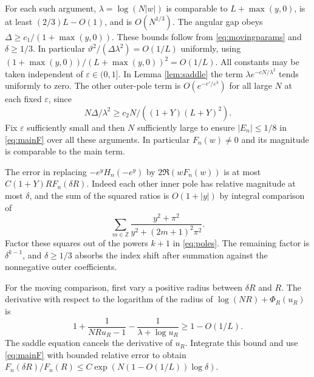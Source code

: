\documentclass[11pt]{article}
\begin{document}
For each such argument, \(\lambda=\log(N|w|)\) is comparable to \(L+\max(y,0)\), is at least \((2/3)L-O(1)\), and is \(O(N^{1/3})\). The angular gap obeys \(\Delta\ge c_1/(1+\max(y,0))\). These bounds follow from \eqref{eq:movingparams} and \(\delta\ge1/3\). In particular \(\vartheta^2/(\Delta\lambda^2)=O(1/L)\) uniformly, using \((1+\max(y,0))/(L+\max(y,0))^2=O(1/L)\). All constants may be taken independent of \(\varepsilon\in(0,1]\). In Lemma \ref{lem:saddle} the term \(\lambda e^{-cN/\lambda^2}\) tends uniformly to zero. The other outer-pole term is \(O(e^{-c'/\varepsilon^3})\) for all large \(N\) at each fixed \(\varepsilon\), since
\[
 N\Delta/\lambda^2\ge c_2 N/((1+Y)(L+Y)^2).
\]
Fix \(\varepsilon\) sufficiently small and then \(N\) sufficiently large to ensure \(|E_n|\le1/8\) in \eqref{eq:mainF} over all these arguments. In particular \(F_n(w)\ne0\) and its magnitude is comparable to the main term.

The error in replacing \(-e^y H_n(-e^y)\) by \(2\Re(wF_n(w))\) is at most \(C(1+Y)R F_n(\delta R)\). Indeed each other inner pole has relative magnitude at most \(\delta\), and the sum of the squared ratios is \(O(1+|y|)\) by integral comparison of
\[
 \sum_{m\in\mathbb Z}\frac{y^2+\pi^2}{y^2+(2m+1)^2\pi^2}.
\]
Factor these squares out of the powers \(k+1\) in \eqref{eq:poles}. The remaining factor is \(\delta^{k-1}\), and \(\delta\ge1/3\) absorbs the index shift after summation against the nonnegative outer coefficients.

For the moving comparison, first vary a positive radius between \(\delta R\) and \(R\). The derivative with respect to the logarithm of the radius of \(\log(NR)+\Phi_R(u_R)\) is
\[
 1+\frac{1}{NRu_R-1}-\frac{1}{\lambda+\log u_R}\ge1-O(1/L).
\]
The saddle equation cancels the derivative of \(u_R\). Integrate this bound and use \eqref{eq:mainF} with bounded relative error to obtain \(F_n(\delta R)/F_n(R)\le C\exp(N(1-O(1/L))\log\delta)\).
\end{document}
